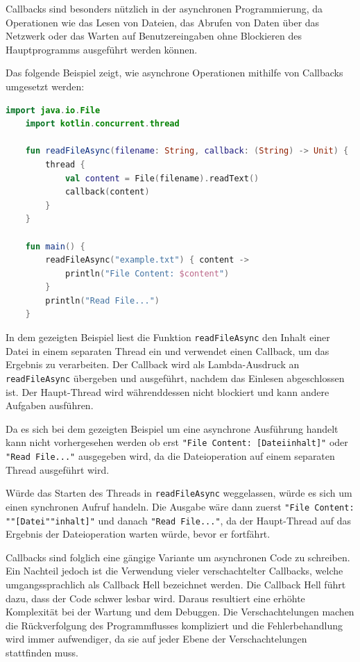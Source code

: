 \documentclass[fontsize=12pt,paper=a4,twoside=semi,parskip=half-,headsepline,headinclude]{scrreprt}
\begin{document}
Callbacks sind besonders nützlich in der asynchronen Programmierung, da Operationen wie das Lesen von Dateien, das Abrufen von Daten über das Netzwerk oder das Warten auf Benutzereingaben ohne Blockieren des Hauptprogramms ausgeführt werden können.

Das folgende Beispiel zeigt, wie asynchrone Operationen mithilfe von Callbacks umgesetzt werden:

\begin{lstlisting}[language=Kotlin]
	import java.io.File
	import kotlin.concurrent.thread
	
	fun readFileAsync(filename: String, callback: (String) -> Unit) {
		thread {
			val content = File(filename).readText()
			callback(content)
		}
	}
	
	fun main() {
		readFileAsync("example.txt") { content ->
			println("File Content: $content")
		}
		println("Read File...")
	}
\end{lstlisting}

In dem gezeigten Beispiel liest die Funktion \texttt{readFileAsync} den Inhalt einer Datei in einem separaten Thread ein und verwendet einen Callback, um das Ergebnis zu verarbeiten. Der Callback wird als Lambda-Ausdruck an \texttt{readFileAsync} übergeben und ausgeführt, nachdem das Einlesen abgeschlossen ist. Der Haupt-Thread wird währenddessen nicht blockiert und kann andere Aufgaben ausführen.

Da es sich bei dem gezeigten Beispiel um eine asynchrone Ausführung handelt kann nicht vorhergesehen werden ob erst \texttt{"File Content: [Dateiinhalt]"} oder \texttt{"Read File..."} ausgegeben wird, da die Dateioperation auf einem separaten Thread ausgeführt wird.

Würde das Starten des Threads in \texttt{readFileAsync} weggelassen, würde es sich um einen synchronen Aufruf handeln. Die Ausgabe wäre dann zuerst \texttt{"File Content: ""[Datei""inhalt]"} und danach \texttt{"Read File..."}, da der Haupt-Thread auf das Ergebnis der Dateioperation warten würde, bevor er fortfährt.

Callbacks sind folglich eine gängige Variante um asynchronen Code zu schreiben. Ein Nachteil jedoch ist die Verwendung vieler verschachtelter Callbacks, welche umgangssprachlich als Callback Hell bezeichnet werden\cite{Leger2021}. Die Callback Hell führt dazu, dass der Code schwer lesbar wird. Daraus resultiert eine erhöhte Komplexität bei der Wartung und dem Debuggen. Die Verschachtelungen machen die Rückverfolgung des Programmflusses kompliziert und  die Fehlerbehandlung wird immer aufwendiger, da sie auf jeder Ebene der Verschachtelungen stattfinden muss.
\end{document}

